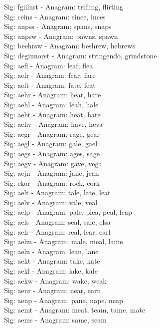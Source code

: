 Sig: {fgiilnrt} - Anagram: trifling, flirting \\
Sig: {ceins} - Anagram: since, inces \\
Sig: {anpss} - Anagram: spans, snaps \\
Sig: {anpsw} - Anagram: pawns, spawn \\
Sig: {beehrsw} - Anagram: beshrew, hebrews \\
Sig: {deginnorst} - Anagram: stringendo, grindstone \\
Sig: {aefl} - Anagram: leaf, flea \\
Sig: {aefr} - Anagram: fear, fare \\
Sig: {aeft} - Anagram: fate, feat \\
Sig: {aehr} - Anagram: hear, hare \\
Sig: {aehl} - Anagram: leah, hale \\
Sig: {aeht} - Anagram: heat, hate \\
Sig: {aehv} - Anagram: have, heva \\
Sig: {aegr} - Anagram: rage, gear \\
Sig: {aegl} - Anagram: gale, gael \\
Sig: {aegs} - Anagram: ages, sage \\
Sig: {aegv} - Anagram: gave, vega \\
Sig: {aejn} - Anagram: jane, jean \\
Sig: {ckor} - Anagram: rock, cork \\
Sig: {aelt} - Anagram: tale, late, leat \\
Sig: {aelv} - Anagram: vale, veal \\
Sig: {aelp} - Anagram: pale, plea, peal, leap \\
Sig: {aels} - Anagram: seal, sale, elsa \\
Sig: {aelr} - Anagram: real, lear, earl \\
Sig: {aelm} - Anagram: male, meal, lame \\
Sig: {aeln} - Anagram: lean, lane \\
Sig: {aekt} - Anagram: take, kate \\
Sig: {aekl} - Anagram: lake, kale \\
Sig: {aekw} - Anagram: wake, weak \\
Sig: {aenr} - Anagram: near, earn \\
Sig: {aenp} - Anagram: pane, nape, neap \\
Sig: {aemt} - Anagram: meat, team, tame, mate \\
Sig: {aems} - Anagram: same, seam \\
